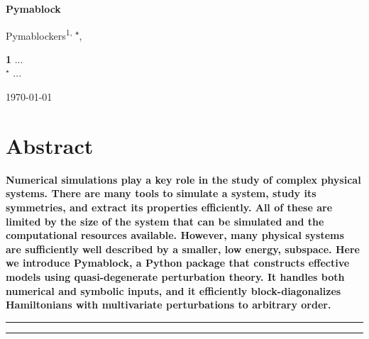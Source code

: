 \documentclass[submission, Codebases]{SciPost}
\begin{document}
\begin{center}
{\Large \textbf{Pymablock}}
\end{center}

\begin{center}
Pymablockers\textsuperscript{1, $\star$},
\end{center}

\begin{center}
{\bf 1} ...
\\
${}^\star$ {\small \sf ...}
\end{center}

\begin{center}
    \today
\end{center}

\section*{Abstract}
{\bf
Numerical simulations play a key role in the study of complex physical systems.
There are many tools to simulate a system, study its symmetries, and extract its properties efficiently.
All of these are limited by the size of the system that can be simulated and the computational resources available.
However, many physical systems are sufficiently well described by a smaller, low energy, subspace.
Here we introduce Pymablock, a Python package that constructs effective models using quasi-degenerate perturbation theory.
It handles both numerical and symbolic inputs, and it efficiently block-diagonalizes Hamiltonians with multivariate perturbations to arbitrary order.
}

\vspace{10pt}
\noindent\rule{\textwidth}{1pt}
\tableofcontents\thispagestyle{fancy}
\noindent\rule{\textwidth}{1pt}
\vspace{10pt}








\printglossaries





\nolinenumbers
\end{document}
